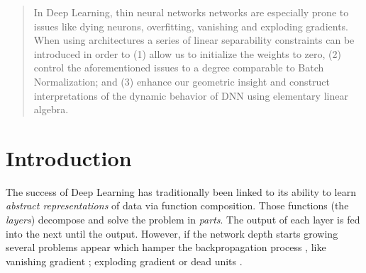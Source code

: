\begin{abstract}
In Deep Learning, thin neural networks networks are especially prone to issues like dying neurons, overfitting, vanishing and exploding gradients. When using \ReLU architectures a series of linear separability  constraints  can  be  introduced  in order to (1)  allow  us  to  initialize  the  weights  to  zero, (2) control the aforementioned issues to a degree comparable to Batch Normalization; and (3)  enhance our geometric insight and construct interpretations of the dynamic behavior of DNN using elementary linear algebra.
\end{abstract}

\section{Introduction}\label{sec:introduction}

The success of Deep Learning has traditionally been linked to its ability to learn \emph{abstract representations} of data via function composition\cite{LeCun06atutorial}. Those functions (the \emph{layers}) decompose and solve the problem in \emph{parts}\cite{resnetSubtree}. The output of each layer is fed into the next until the output. However, if the network depth starts growing several problems appear which hamper the backpropagation process \cite{backprop}, like vanishing gradient \cite{vanishing1,vanishing2}; exploding gradient \cite{exploding} or dead units \cite{leaky,whyreludie,whenneuronsfail}. 

